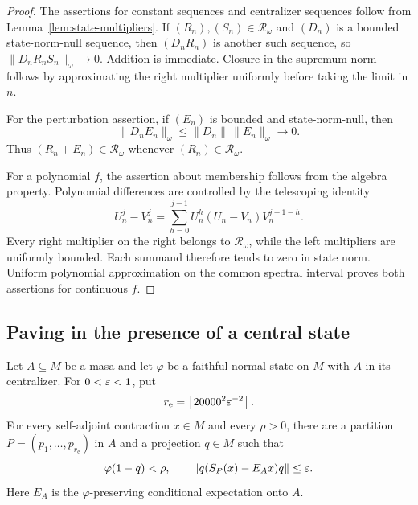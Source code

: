 \begin{proof}
The assertions for constant sequences and centralizer sequences follow from Lemma~\ref{lem:state-multipliers}. If $(R_n),(S_n)\in\mathscr R_\omega$ and $(D_n)$ is a bounded state-norm-null sequence, then $(D_nR_n)$ is another such sequence, so $\|D_nR_nS_n\|_\omega\to0$. Addition is immediate. Closure in the supremum norm follows by approximating the right multiplier uniformly before taking the limit in $n$.

For the perturbation assertion, if $(E_n)$ is bounded and state-norm-null, then
\[
 \|D_nE_n\|_\omega\le\|D_n\|\,\|E_n\|_\omega\longrightarrow0.
\]
Thus $(R_n+E_n)\in\mathscr R_\omega$ whenever $(R_n)\in\mathscr R_\omega$.

For a polynomial $f$, the assertion about membership follows from the algebra property. Polynomial differences are controlled by the telescoping identity
\[
 U_n^j-V_n^j=\sum_{h=0}^{j-1}U_n^h(U_n-V_n)V_n^{j-1-h}.
\]
Every right multiplier on the right belongs to $\mathscr R_\omega$, while the left multipliers are uniformly bounded. Each summand therefore tends to zero in state norm. Uniform polynomial approximation on the common spectral interval proves both assertions for continuous $f$.
\end{proof}

\subsection{Paving in the presence of a central state}

\begin{proposition}\label{prop:expected}
Let $A\subseteq M$ be a masa and let $\varphi$ be a faithful normal state on $M$ with $A$ in its centralizer. For $0<\varepsilon<1$, put
\[
 r_{\mathrm e}=\left\lceil 20000^2\varepsilon^{-2}\right\rceil.
\]
For every self-adjoint contraction $x\in M$ and every $\rho>0$, there are a partition $P=(p_1,\ldots,p_{r_{\mathrm e}})$ in $A$ and a projection $q\in M$ such that
\[
 \varphi(1-q)<\rho,
 \qquad \|q(S_P(x)-E_Ax)q\|\le\varepsilon.
\]
Here $E_A$ is the $\varphi$-preserving conditional expectation onto $A$.
\end{proposition}

